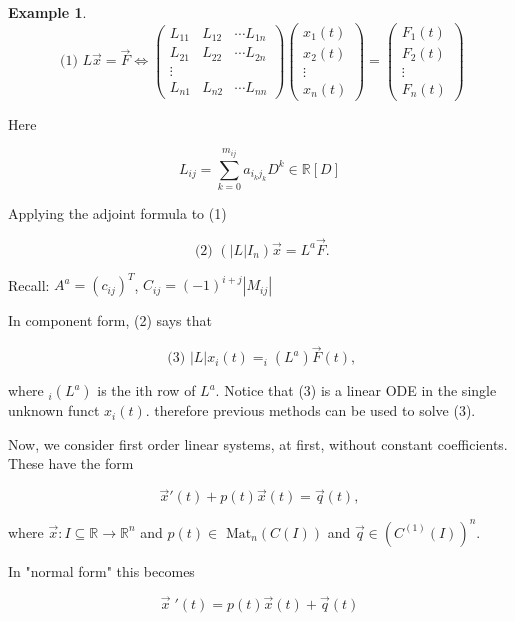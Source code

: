 \documentclass[12pt,a4paper]{article}
\theoremstyle{definition}
\newtheorem*{example}{Example}
\begin{document}
\begin{example}
  \[ \text{ (1) }
  L \vec{x} = \vec{F} \iff 
  \begin{pmatrix}
    L_{11} & L_{12} & \cdots L_{1n} \\
    L_{21} & L_{22} & \cdots L_{2n} \\
    \vdots & \\
    L_{n1} & L_{n2} & \cdots L_{nn} 
  \end{pmatrix}
  \begin{pmatrix}
    x_1(t) \\
    x_2(t) \\
    \vdots \\
    x_n(t)
  \end{pmatrix}
  =
  \begin{pmatrix}
    F_1(t) \\
    F_2(t) \\
    \vdots \\
    F_n(t)
  \end{pmatrix}
  \]

  Here 

  \[ L_{ij} = \sum_{k=0}^{m_{ij}} a_{i_k j_k} D^k \in \mathbb{R}[D] \]

  Applying the adjoint formula to (1) 

  \[ \text{ (2) } (|L|I_n) \vec{x} = L^a \vec{F}. \]

  Recall: \( A^a = (c_{ij})^T \), \( C_{ij} = (-1)^{i+j} |M_{ij}| \)

  In component form, (2) says that 

  \[ \text{ (3) } |L|x_i(t) = _i(L^a) \vec{F}(t) ,\]

  where \( _i(L^a) \) is the ith row of \( L^a \). Notice that (3) is a
  linear ODE in the single unknown funct \( x_i(t) \). therefore previous
  methods can be used to solve (3). 
\end{example}


Now, we consider first order linear systems, at first, without constant
coefficients. These have the form 

\[ \vec{x}'(t) + p(t) \vec{x}(t) = \vec{q}(t),  \]

where \( \vec{x}: I \subseteq \mathbb{R} \to \mathbb{R}^n \) and \( p(t)
\in \text{ Mat}_n (C(I)) \) and \( \vec{q} \in ( C^{(1)}(I))^n \). 

In "normal form" this becomes 

\[   \vec{x} \;'(t) = p(t) \vec{x}(t) + \vec{q}(t) \]
\end{document}
